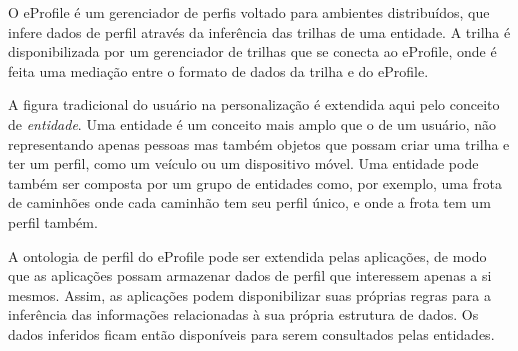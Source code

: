 O eProfile é um gerenciador de perfis voltado para ambientes distribuídos, que infere dados de perfil através da inferência das trilhas de uma entidade. A trilha é disponibilizada por um gerenciador de trilhas que se conecta ao eProfile, onde é feita uma mediação entre o formato de dados da trilha e do eProfile.

A figura tradicional do usuário na personalização é extendida aqui pelo conceito de \emph{entidade}. Uma entidade é um conceito mais amplo que o de um usuário, não representando apenas pessoas mas também objetos que possam criar uma trilha e ter um perfil, como um veículo ou um dispositivo móvel. Uma entidade pode também ser composta por um grupo de entidades como, por exemplo, uma frota de caminhões onde cada caminhão tem seu perfil único, e onde a frota tem um perfil também.

A ontologia de perfil do eProfile pode ser extendida pelas aplicações, de modo que as aplicações possam armazenar dados de perfil que interessem apenas a si mesmos. Assim, as aplicações podem disponibilizar suas próprias regras para a inferência das informações relacionadas à sua própria estrutura de dados. Os dados inferidos ficam então disponíveis para serem consultados pelas entidades.
